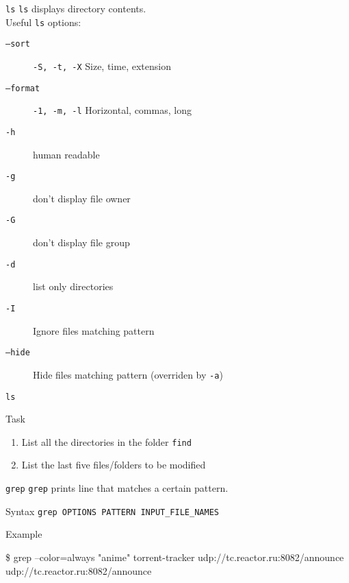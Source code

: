 \documentclass[11pt]{beamer}
\begin{document}
			\begin{frame}{ \texttt{ls}}
				\texttt{ls} displays directory contents. \\
				Useful \texttt{ls} options:
				\begin{description}
					\item[ \texttt{--sort}] \texttt{-S, -t, -X} Size, time, extension
					\item[ \texttt{--format}] \texttt{-1, -m, -l} Horizontal, commas, long
					\item[ \texttt{-h}] human readable
					\item[ \texttt{-g}] don't display file owner
					\item[ \texttt{-G}] don't display file group
					\item[ \texttt{-d}] list only directories
					\item[ \texttt{-I}] Ignore files matching pattern
					\item[ \texttt{--hide}]  Hide files matching pattern (overriden by \texttt{-a})
				\end{description}
			\end{frame}

			\begin{frame}{ \texttt{ls}}
				\begin{block}{Task}
					\begin{enumerate}
						\item List all the directories in the folder \texttt{find}
						\item List the last five files/folders to be modified
					\end{enumerate}
				\end{block}	
				\begin{example}
					\begin{semiverbatim}
						 \end{semiverbatim}	
				\end{example}
			\end{frame}

			\begin{frame}{\texttt{grep}}
				\texttt{grep} prints line that matches a certain pattern.
				\begin{alertblock}{Syntax}
					\texttt{grep OPTIONS PATTERN INPUT\_FILE\_NAMES}
				\end{alertblock}
				\begin{exampleblock}{Example}
					\begin{semiverbatim}
						\$ grep --color=always "anime" torrent-tracker
						udp://tc.{\textbf{\color{red}{anime}}}reactor.ru:8082/announce
						udp://tc.{\textbf{\color{red}{anime}}}reactor.ru:8082/announce 
					\end{semiverbatim}	
				\end{exampleblock}
			\end{frame}
\end{document}
